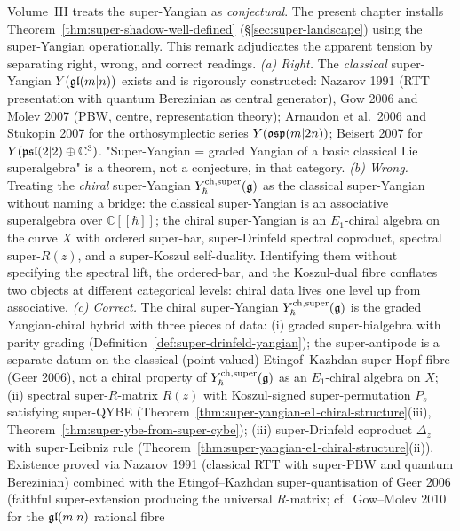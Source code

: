 \begin{remark}
\label{rem:super-yangian-existence-scope}
Volume~III treats the super-Yangian as \emph{conjectural}. The present chapter installs
Theorem~\ref{thm:super-shadow-well-defined}
(\S\ref{sec:super-landscape}) using the super-Yangian operationally.
This remark adjudicates the apparent tension by separating right,
wrong, and correct readings.
\emph{(a) Right.} The \emph{classical} super-Yangian $Y(\mathfrak{gl}(m|n))$
exists and is rigorously constructed: Nazarov 1991 (RTT presentation
with quantum Berezinian as central generator), Gow 2006 and Molev 2007
(PBW, centre, representation theory); Arnaudon et al.\ 2006 and
Stukopin 2007 for the orthosymplectic series $Y(\mathfrak{osp}(m|2n))$;
Beisert 2007 for $Y(\mathfrak{psl}(2|2)\oplus\mathbb{C}^3)$. "Super-Yangian =
graded Yangian of a basic classical Lie superalgebra" is a theorem, not
a conjecture, in that category.
\emph{(b) Wrong.} Treating the \emph{chiral} super-Yangian
$Y^{\mathrm{ch},\mathrm{super}}_{\hbar}(\mathfrak{g})$ as the classical super-Yangian without naming a
bridge: the classical super-Yangian is an associative superalgebra over
$\mathbb{C}[\![\hbar]\!]$; the chiral super-Yangian is an
$E_1$-chiral algebra on the curve $X$ with ordered super-bar,
super-Drinfeld spectral coproduct, spectral super-$R(z)$, and a
super-Koszul self-duality. Identifying them without specifying the
spectral lift, the ordered-bar, and the Koszul-dual fibre conflates two
objects at different categorical levels: chiral data lives one level
up from associative.
\emph{(c) Correct.} The chiral super-Yangian
$Y^{\mathrm{ch},\mathrm{super}}_{\hbar}(\mathfrak{g})$ is the graded Yangian-chiral hybrid with three
pieces of data: (i) graded super-bialgebra with parity grading
(Definition~\ref{def:super-drinfeld-yangian}); the super-antipode is a
separate datum on the classical (point-valued) Etingof--Kazhdan
super-Hopf fibre (Geer 2006), not a chiral property of
$Y^{\mathrm{ch},\mathrm{super}}_{\hbar}(\mathfrak{g})$ as an $E_1$-chiral algebra on $X$;
(ii) spectral super-$R$-matrix
$R(z)$ with Koszul-signed super-permutation $P_s$ satisfying super-QYBE
(Theorem~\ref{thm:super-yangian-e1-chiral-structure}(iii),
Theorem~\ref{thm:super-ybe-from-super-cybe}); (iii) super-Drinfeld
coproduct $\Delta_z$ with super-Leibniz rule
(Theorem~\ref{thm:super-yangian-e1-chiral-structure}(ii)). Existence
proved via Nazarov 1991 (classical RTT with super-PBW and quantum
Berezinian) combined with the Etingof--Kazhdan super-quantisation of
Geer 2006 (faithful super-extension producing the universal
$R$-matrix; cf.\ Gow--Molev 2010 for the $\mathfrak{gl}(m|n)$ rational fibre

\end{remark}
